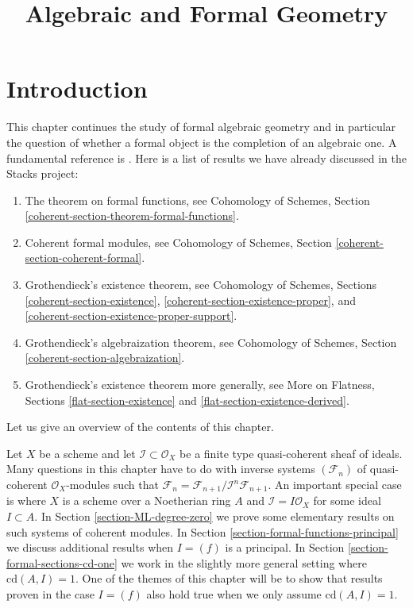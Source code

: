 

%


\title{Algebraic and Formal Geometry}


\maketitle

\label{section-phantom}

\tableofcontents

\section{Introduction}
\label{section-introduction}

\noindent
This chapter continues the study of formal algebraic geometry
and in particular the question of whether a formal object is
the completion of an algebraic one. A fundamental reference is \cite{SGA2}.
Here is a list of results we have already discussed
in the Stacks project:
\begin{enumerate}
\item The theorem on formal functions, see
Cohomology of Schemes, Section \ref{coherent-section-theorem-formal-functions}.
\item Coherent formal modules, see
Cohomology of Schemes, Section \ref{coherent-section-coherent-formal}.
\item Grothendieck's existence theorem, see
Cohomology of Schemes, Sections \ref{coherent-section-existence},
\ref{coherent-section-existence-proper}, and
\ref{coherent-section-existence-proper-support}.
\item Grothendieck's algebraization theorem, see
Cohomology of Schemes, Section \ref{coherent-section-algebraization}.
\item Grothendieck's existence theorem more generally, see
More on Flatness, Sections \ref{flat-section-existence} and
\ref{flat-section-existence-derived}.
\end{enumerate}
Let us give an overview of the contents of this chapter.

\medskip\noindent
Let $X$ be a scheme and let $\mathcal{I} \subset \mathcal{O}_X$
be a finite type quasi-coherent sheaf of ideals. Many questions
in this chapter have to do with inverse systems $(\mathcal{F}_n)$
of quasi-coherent $\mathcal{O}_X$-modules such that
$\mathcal{F}_n = \mathcal{F}_{n + 1}/\mathcal{I}^n\mathcal{F}_{n + 1}$.
An important special case is where $X$ is a scheme over a Noetherian
ring $A$ and $\mathcal{I} = I \mathcal{O}_X$ for some ideal $I \subset A$.
In Section \ref{section-ML-degree-zero}
we prove some elementary results on such systems of coherent modules.
In Section \ref{section-formal-functions-principal} we discuss
additional results when $I = (f)$ is a principal. In Section
\ref{section-formal-sections-cd-one} we work in the slightly
more general setting where $\text{cd}(A, I) = 1$. One of the themes
of this chapter will be to show that results proven in the case $I = (f)$
also hold true when we only assume $\text{cd}(A, I) = 1$.

